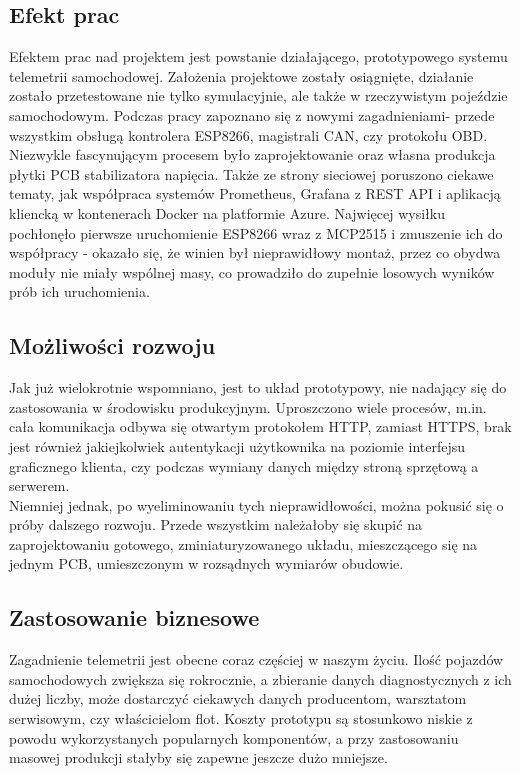 \documentclass[10pt,a4paper]{article}
\begin{document}
		\subsection{Efekt prac}
		Efektem prac nad projektem jest powstanie działającego, prototypowego systemu telemetrii samochodowej. Założenia projektowe zostały osiągnięte, działanie zostało przetestowane nie tylko symulacyjnie, ale także w rzeczywistym pojeździe samochodowym. Podczas pracy zapoznano się z nowymi zagadnieniami- przede wszystkim obsługą kontrolera ESP8266, magistrali CAN, czy protokołu OBD. Niezwykle fascynującym procesem było zaprojektowanie oraz własna produkcja płytki PCB stabilizatora napięcia. Także ze strony sieciowej poruszono ciekawe tematy, jak współpraca systemów Prometheus, Grafana z REST API i aplikacją kliencką w kontenerach Docker na platformie Azure. Najwięcej wysiłku pochłonęło pierwsze uruchomienie ESP8266 wraz z MCP2515 i zmuszenie ich do współpracy - okazało się, że winien był nieprawidłowy montaż, przez co obydwa moduły nie miały wspólnej masy, co prowadziło do zupełnie losowych wyników prób ich uruchomienia.
		
		\subsection{Możliwości rozwoju}
		Jak już wielokrotnie wspomniano, jest to układ prototypowy, nie nadający się do zastosowania w środowisku produkcyjnym. Uproszczono wiele procesów, m.in. cała komunikacja odbywa się otwartym protokołem HTTP, zamiast HTTPS, brak jest również jakiejkolwiek autentykacji użytkownika na poziomie interfejsu graficznego klienta, czy podczas wymiany danych między stroną sprzętową a serwerem.\\
		Niemniej jednak, po wyeliminowaniu tych nieprawidłowości, można pokusić się o próby dalszego rozwoju. Przede wszystkim należałoby się skupić na zaprojektowaniu gotowego, zminiaturyzowanego układu, mieszczącego się na jednym PCB, umieszczonym w rozsądnych wymiarów obudowie.
		
		\subsection{Zastosowanie biznesowe}
		Zagadnienie telemetrii jest obecne coraz częściej w naszym życiu. Ilość pojazdów samochodowych zwiększa się rokrocznie, a zbieranie danych diagnostycznych z ich dużej liczby, może dostarczyć ciekawych danych producentom, warsztatom serwisowym, czy właścicielom flot. Koszty prototypu są stosunkowo niskie z powodu wykorzystanych popularnych komponentów, a przy zastosowaniu masowej produkcji stałyby się zapewne jeszcze dużo mniejsze.
		
\end{document}

